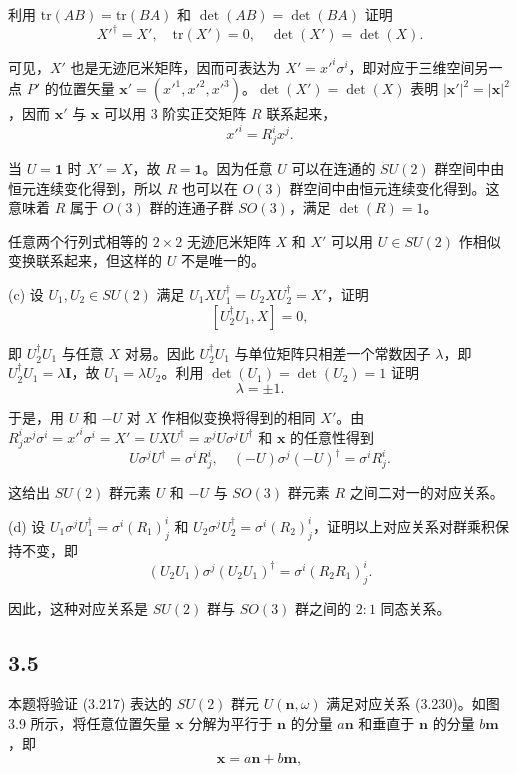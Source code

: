 利用 $ \mathrm{tr}(AB) = \mathrm{tr}(BA) $ 和 $ \det(AB) = \det(BA) $ 证明
$$ X'^\dagger = X', \quad \mathrm{tr}(X') = 0, \quad \det(X') = \det(X). \tag{3.226} $$

可见，$ X' $ 也是无迹厄米矩阵，因而可表达为 $ X' = x'^i \sigma^i $，即对应于三维空间另一点 $ P' $ 的位置矢量 $ \mathbf{x}' = (x'^1, x'^2, x'^3) $。$ \det(X') = \det(X) $ 表明 $ |\mathbf{x}'|^2 = |\mathbf{x}|^2 $，因而 $ \mathbf{x}' $ 与 $ \mathbf{x} $ 可以用 3 阶实正交矩阵 $ R $ 联系起来，
$$ x'^i = R^i_j x^j. \tag{3.227} $$

当 $ U = \mathbf{1} $ 时 $ X' = X $，故 $ R = \mathbf{1} $。因为任意 $ U $ 可以在连通的 $ SU(2) $ 群空间中由恒元连续变化得到，所以 $ R $ 也可以在 $ O(3) $ 群空间中由恒元连续变化得到。这意味着 $ R $ 属于 $ O(3) $ 群的连通子群 $ SO(3) $，满足 $ \det(R) = 1 $。

任意两个行列式相等的 $ 2 \times 2 $ 无迹厄米矩阵 $ X $ 和 $ X' $ 可以用 $ U \in SU(2) $ 作相似变换联系起来，但这样的 $ U $ 不是唯一的。

(c) 设 $ U_1, U_2 \in SU(2) $ 满足 $ U_1 X U_1^\dagger = U_2 X U_2^\dagger = X' $，证明
$$ [U_2^\dagger U_1, X] = 0, \tag{3.228} $$

即 $ U_2^\dagger U_1 $ 与任意 $ X $ 对易。因此 $ U_2^\dagger U_1 $ 与单位矩阵只相差一个常数因子 $ \lambda $，即 $ U_2^\dagger U_1 = \lambda \mathbf{I} $，故 $ U_1 = \lambda U_2 $。利用 $ \det(U_1) = \det(U_2) = 1 $ 证明
$$ \lambda = \pm 1. \tag{3.229} $$

于是，用 $ U $ 和 $ -U $ 对 $ X $ 作相似变换将得到的相同 $ X' $。由 $ R^i_j x^j \sigma^i = x'^i \sigma^i = X' = U X U^\dagger = x^j U \sigma^j U^\dagger $ 和 $ \mathbf{x} $ 的任意性得到
$$ U \sigma^j U^\dagger = \sigma^i R^i_j, \quad (-U) \sigma^j (-U)^\dagger = \sigma^i R^i_j. \tag{3.230} $$

这给出 $ SU(2) $ 群元素 $ U $ 和 $ -U $ 与 $ SO(3) $ 群元素 $ R $ 之间二对一的对应关系。

(d) 设 $ U_1 \sigma^j U_1^\dagger = \sigma^i (R_1)^i_j $ 和 $ U_2 \sigma^j U_2^\dagger = \sigma^i (R_2)^i_j $，证明以上对应关系对群乘积保持不变，即
$$ (U_2 U_1) \sigma^j (U_2 U_1)^\dagger = \sigma^i (R_2 R_1)^i_j. \tag{3.231} $$

因此，这种对应关系是 $ SU(2) $ 群与 $ SO(3) $ 群之间的 $ 2:1 $ 同态关系。

\newpage
\subsection{3.5}
本题将验证 (3.217) 表达的 $ SU(2) $ 群元 $ U(\mathbf{n}, \omega) $ 满足对应关系 (3.230)。如图 3.9 所示，将任意位置矢量 $ \mathbf{x} $ 分解为平行于 $ \mathbf{n} $ 的分量 $ a \mathbf{n} $ 和垂直于 $ \mathbf{n} $ 的分量 $ b \mathbf{m} $，即
$$ \mathbf{x} = a \mathbf{n} + b \mathbf{m}, \tag{3.232} $$

